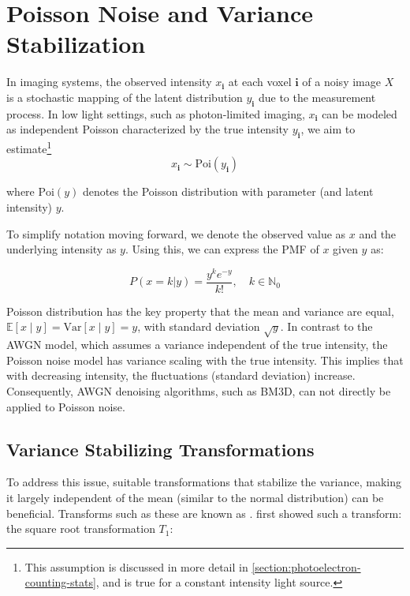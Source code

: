 \section{Poisson Noise and Variance Stabilization}\label{sec:poisson-noise-model}
In imaging systems, the observed intensity $x_{\mathbf{i}}$ at each voxel $\mathbf{i}$ of a noisy image $X$ is a stochastic mapping of the latent distribution $y_{\mathbf{i}}$ due to the measurement process. In low light settings, such as photon-limited imaging, $x_{\mathbf{i}}$ can be modeled as independent Poisson characterized by the true intensity $y_{\mathbf{i}}$, we aim to estimate\footnote{This assumption is discussed in more detail in \cref{section:photoelectron-counting-stats}, and is true for a constant intensity light source.} \cite{makitaloOptimalInversionAnscombe2011,kimDeepLearningbasedStatistical2021} 
\begin{equation*}
    x_{\mathbf{i}} \sim \text{Poi}(y_{\mathbf{i}})
\end{equation*}

where $\text{Poi}(y)$ denotes the Poisson distribution with parameter (and latent intensity) $y$. 

To simplify notation moving forward, we denote the observed value as $x$ and the underlying intensity as $y$. Using this, we can express the \gls{PMF} of $x$ given $y$  as:

\begin{equation}\label{eq:poisson-pmf}
    P(x = k| y) = \frac{y^k e^{-y}}{k!} , \quad k \in \mathbb{N}_0
\end{equation}

Poisson distribution has the key property that the mean and variance are equal, $\mathbb{E}[x\mid y] = \text{Var}[x\mid y] = y$, with standard deviation $\sqrt{y}$. In contrast to the \gls{AWGN} model, which assumes a variance independent of the true intensity, the Poisson noise model has variance scaling with the true intensity. This implies that with decreasing intensity, the fluctuations (standard deviation) increase. Consequently, \gls{AWGN} denoising algorithms, such as \gls{BM3D}, can not directly be applied to Poisson noise.

\subsection{Variance Stabilizing Transformations}
To address this issue, suitable transformations that stabilize the variance, making it largely independent of the mean (similar to the normal distribution) can be beneficial. Transforms such as these are known as . \citeauthor{bartlettSquareRootTransformation1936} \cite{bartlettSquareRootTransformation1936} first showed such a transform: the square root transformation $T_1$:

